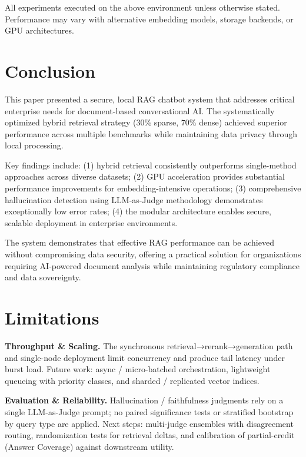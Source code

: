 \documentclass[11pt]{article}
\begin{document}
All experiments executed on the above environment unless otherwise stated. Performance may vary with alternative embedding models, storage backends, or GPU architectures.


\section{Conclusion}

This paper presented a secure, local RAG chatbot system that addresses critical enterprise needs for document-based conversational AI. The systematically optimized hybrid retrieval strategy (30\% sparse, 70\% dense) achieved superior performance across multiple benchmarks while maintaining data privacy through local processing.

Key findings include: (1) hybrid retrieval consistently outperforms single-method approaches across diverse datasets; (2) GPU acceleration provides substantial performance improvements for embedding-intensive operations; (3) comprehensive hallucination detection using LLM-as-Judge methodology demonstrates exceptionally low error rates; (4) the modular architecture enables secure, scalable deployment in enterprise environments.

The system demonstrates that effective RAG performance can be achieved without compromising data security, offering a practical solution for organizations requiring AI-powered document analysis while maintaining regulatory compliance and data sovereignty.

\section*{Limitations}

\textbf{Throughput \& Scaling.} The synchronous retrieval→rerank→generation path and single-node deployment limit concurrency and produce tail latency under burst load. Future work: async / micro-batched orchestration, lightweight queueing with priority classes, and sharded / replicated vector indices.

\textbf{Evaluation \& Reliability.} Hallucination / faithfulness judgments rely on a single LLM-as-Judge prompt; no paired significance tests or stratified bootstrap by query type are applied. Next steps: multi-judge ensembles with disagreement routing, randomization tests for retrieval deltas, and calibration of partial-credit (Answer Coverage) against downstream utility.
\end{document}
